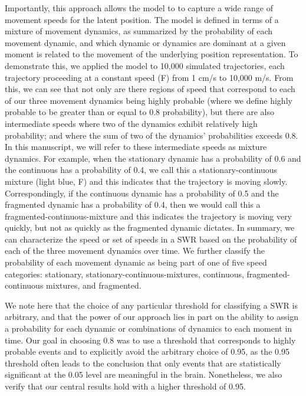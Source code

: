 \documentclass[9pt,lineno]{elife}
\begin{document}
Importantly, this approach allows the model to to capture a wide range of movement speeds for the latent position. The model is defined in terms of a mixture of movement dynamics, as summarized by the probability of each movement dynamic, and which dynamic or dynamics are dominant at a given moment is related to the movement of the underlying position representation. To demonstrate this, we applied the model to 10,000 simulated trajectories, each trajectory proceeding at a constant speed (F) from 1 cm/s to 10,000 m/s. From this, we can see that not only are there regions of speed that correspond to each of our three movement dynamics being highly probable (where we define highly probable to be greater than or equal to 0.8 probability), but there are also intermediate speeds where two of the dynamics exhibit relatively high probability; and where the sum of two of the dynamics' probabilities exceeds 0.8. In this manuscript, we will refer to these intermediate speeds as mixture dynamics. For example, when the stationary dynamic has a probability of 0.6 and the continuous has a probability of 0.4, we call this a stationary-continuous mixture (light blue, F) and this indicates that the trajectory is moving slowly. Correspondingly, if the continuous dynamic has a probability of 0.5 and the fragmented dynamic has a probability of 0.4, then we would call this a fragmented-continuous-mixture and this indicates the trajectory is moving very quickly, but not as quickly as the fragmented dynamic dictates. In summary, we can characterize the speed or set of speeds in a SWR based on the probability of each of the three movement dynamics over time. We further classify the probability of each movement dynamic as being part of one of five speed categories: stationary, stationary-continuous-mixtures, continuous, fragmented-continuous mixtures, and fragmented.

We note here that the choice of any particular threshold for classifying a SWR is arbitrary, and that the power of our approach lies in part on the ability to assign a probability for each dynamic or combinations of dynamics to each moment in time. Our goal in choosing 0.8 was to use a threshold that corresponds to highly probable events and to explicitly avoid the arbitrary choice of 0.95, as the 0.95 threshold often leads to the conclusion that only events that are statistically significant at the 0.05 level are meaningful in the brain. Nonetheless, we also verify that our central results hold with a higher threshold of 0.95. 
\end{document}
